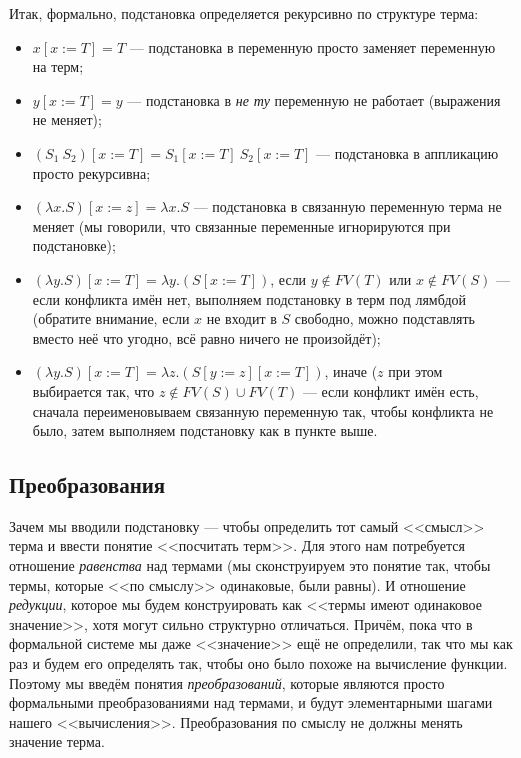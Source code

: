 \documentclass[a5paper]{article}
\begin{document}
Итак, формально, подстановка определяется рекурсивно по структуре терма:

\begin{itemize}
    \item $x[x := T] = T$ --- подстановка в переменную просто заменяет переменную на терм;
    \item $y[x := T] = y$ --- подстановка в \textit{не ту} переменную не работает (выражения не меняет);
    \item $(S_1\ S_2)[x := T] = S_1[x := T]\ S_2[x := T]$ --- подстановка в аппликацию просто рекурсивна;
    \item $(\lambda x.S)[x := z] = \lambda x.S$ --- подстановка в связанную переменную терма не меняет (мы говорили, что связанные переменные игнорируются при подстановке);
    \item $(\lambda y.S)[x := T] = \lambda y.(S[x := T])$, если $y \notin FV(T)$ или $x \notin FV(S)$ --- если конфликта имён нет, выполняем подстановку в терм под лямбдой (обратите внимание, если $x$ не входит в $S$ свободно, можно подставлять вместо неё что угодно, всё равно ничего не произойдёт);
    \item $(\lambda y.S)[x := T] = \lambda z.(S[y := z][x := T])$, иначе ($z$ при этом выбирается так, что $z \notin FV(S) \cup FV(T)$ --- если конфликт имён есть, сначала переименовываем связанную переменную так, чтобы конфликта не было, затем выполняем подстановку как в пункте выше.
\end{itemize}

\subsection{Преобразования}

Зачем мы вводили подстановку --- чтобы определить тот самый <<смысл>> терма и ввести понятие <<посчитать терм>>. Для этого нам потребуется отношение \textit{равенства} над термами (мы сконструируем это понятие так, чтобы термы, которые <<по смыслу>> одинаковые, были равны). И отношение \textit{редукции}, которое мы будем конструировать как <<термы имеют одинаковое значение>>, хотя могут сильно структурно отличаться. Причём, пока что в формальной системе мы даже <<значение>> ещё не определили, так что мы как раз и будем его определять так, чтобы оно было похоже на вычисление функции. Поэтому мы введём понятия \textit{преобразований}, которые являются просто формальными преобразованиями над термами, и будут элементарными шагами нашего <<вычисления>>. Преобразования по смыслу не должны менять значение терма.
\end{document}
